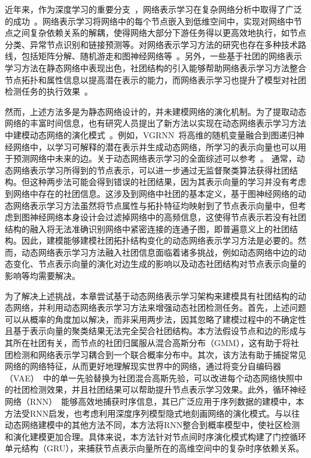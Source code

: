 近年来，作为深度学习的重要分支~\cite{Sun.2021.Xu}，网络表示学习在复杂网络分析中取得了广泛的成功~\cite{iyer2024non,jiang2024self}。网络表示学习将网络中的每个节点嵌入到低维空间中，实现对网络中节点之间复杂依赖关系的解耦，使得网络大部分下游任务得以更高效地执行，如节点分类、异常节点识别和链接预测等。对网络表示学习方法的研究也存在多种技术路线，包括矩阵分解、随机游走和图神经网络等~\cite{ju2024comprehensive,jeyaraj2024deepwalk,NEURIPS2024_015a8c69,zhang2025hmne,yan2024pacer}。另外，一些基于社团的网络表示学习方法在静态网络中表现出色，社团结构的引入能够帮助网络表示学习方法整合节点拓扑和属性信息以提高潜在表示的能力，而网络表示学习也提升了模型对社团检测任务的执行效果~\cite{he2022sssnet,li2024contrastive,rashnodi2024community}。



然而，上述方法多是为静态网络设计的，并未建模网络的演化机制。为了提取动态网络的丰富时间信息，也有研究人员提出了新方法以实现在动态网络表示学习方法中建模动态网络的演化模式~\cite{goyal2020dyngraph2vec,huang2024embedding,7880588,dileo2024temporal,Yang.2020.Shen,pareja2020evolvegcn}。例如，VGRNN~\cite{hajiramezanali2019variational}将高维的随机变量融合到图递归神经网络中，以学习可解释的潜在表示并生成动态网络，所学习的表示向量也可以用于预测网络中未来的边。关于动态网络表示学习的全面综述可以参考~\cite{jmlr:v21:19-447}。
通常，动态网络表示学习所得到的节点表示，可以进一步通过无监督聚类算法获得社团结构。但这种两步法可能会得到错误的社团结果，因为其表示向量的学习并没有考虑到网络中存在的社团信息。这涉及到网络中社团的基本定义，基于图神经网络的动态网络表示学习方法虽然将节点属性与拓扑特征均映射到了节点表示向量中，但考虑到图神经网络本身设计会过滤掉网络中的高频信息，这使得节点表示若没有社团结构的融入将无法准确识别网络中紧密连接的连通子图，即普遍意义上的社团结构。因此，建模能够建模社团拓扑结构变化的动态网络表示学习方法是必要的。然而，动态网络表示学习方法融入社团信息面临着诸多挑战，例如动态网络中边的动态变化、节点表示向量的演化对边生成的影响以及动态社团结构对节点表示向量的影响等均需要解决。



为了解决上述挑战，本章尝试基于动态网络表示学习架构来建模具有社团结构的动态网络，并利用动态网络表示学习方法来增强动态社团检测任务。首先，上述问题可以从概率的角度加以解决，而非采用两步法，因其忽略了建模过程中的不确定性且基于表示向量的聚类结果无法完全契合社团结构。本方法假设节点和边的形成与其所在社团有关，而节点的社团归属服从混合高斯分布（GMM），这有助于将社团检测和网络表示学习耦合到一个联合概率分布中。其次，该方法有助于捕捉常见网络的网络特征，从而更好地理解现实世界中的网络，通过将变分自编码器（VAE）~\cite{liang2024survey}中的单一先验替换为社团混合高斯先验，可以改进每个动态网络快照中的社团检测效果，并且社团结果可以帮助提升节点表示学习效果。此外，循环神经网络（RNN）~\cite{NEURIPS2024_18969919}能够高效地捕获时序信息，其已广泛应用于序列数据的建模中，本方法受RNN启发，也考虑利用深度序列模型隐式地刻画网络的演化模式。与以往动态网络建模中的其他方法不同，本方法将RNN整合到概率模型中，使社区检测和演化建模更加合理。具体来说，本方法针对节点间时序演化模式构建了门控循环单元结构（GRU），来捕获节点表示向量所在的高维空间中的复杂时序依赖关系。

